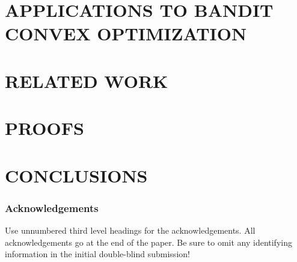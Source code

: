 \documentclass[twoside]{article}
\begin{document}
\section{APPLICATIONS TO BANDIT CONVEX OPTIMIZATION}
\label{sec:ex}


\section{RELATED WORK}
\label{sec:related}


\section{PROOFS}
\label{sec:proofs}
%



\section{CONCLUSIONS}
\label{sec:conc}



\clearpage\newpage



\subsubsection*{Acknowledgements}

Use unnumbered third level headings for the acknowledgements.  All
acknowledgements go at the end of the paper.  Be sure to omit any
identifying information in the initial double-blind submission!
\fi

\clearpage\newpage
\onecolumn
\appendix

\end{document}
